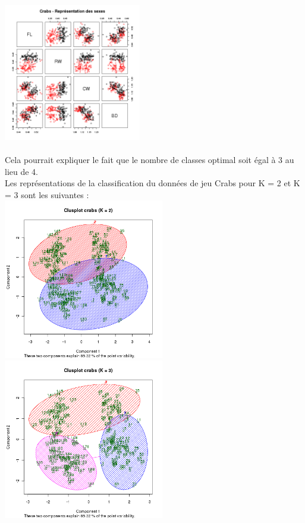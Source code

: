 \documentclass[a4paper, 10pt]{article}
\begin{document}
\includegraphics[height = 6cm, width = 6cm]{plots/plot_crabs_sex_2.png}\\ \\
Cela pourrait expliquer le fait que le nombre de classes optimal soit \'egal \`a 3 au lieu de 4.\\
Les repr\'esentations de la classification du donn\'ees de jeu Crabs pour K = 2 et K = 3 sont les suivantes :\\
\includegraphics[height = 7cm, width = 7cm]{plots/clusplot_crabs_10.png}
\includegraphics[height = 7cm, width = 7cm]{plots/clusplot_crabs_11.png}\\ \\
\end{document}
